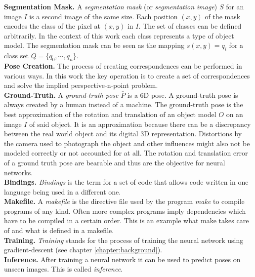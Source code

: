 \noindent\textbf{Segmentation Mask.} A \textit{segmentation mask} (or \textit{segmentation image}) $S$ for an image $I$ is a second image of the same size. Each position $(x, y)$ of the mask encodes the class of the pixel at $(x, y)$ in $I$. The set of classes can be defined arbitrarily. In the context of this work each class represents a type of object model. The segmentation mask can be seen as the mapping $s(x, y) = q_i$ for a class set $Q = \{q_0, \cdots, q_n\}$. \\

\noindent\textbf{Pose Creation.} The process of creating correspondences can be performed in various ways. In this work the key operation is to create a set of correspondences and solve the implied perspective-n-point problem. \\

\noindent\textbf{Ground-Truth.} A \textit{ground-truth pose} $\bar{P}$ is a 6D pose. A ground-truth pose is always created by a human instead of a machine. The ground-truth pose is the best approximation of the rotation and translation of an object model $O$ on an image $I$ of said object. It is an approximation because there can be a discrepancy between the real world object and its digital 3D representation. Distortions by the camera used to photograph the object and other influences might also not be modeled correctly or not accounted for at all. The rotation and translation error of a ground truth pose are bearable and thus are the objective for neural networks. \\

\noindent\textbf{Bindings.} \textit{Bindings} is the term for a set of code that allows code written in one language being used in a different one. \\

\noindent\textbf{Makefile.} A \textit{makefile} is the directive file used by the program \textit{make} to compile programs of any kind. Often more complex programs imply dependencies which have to be compiled in a certain order. This is an example what make takes care of and what is defined in a makefile. \\

\noindent\textbf{Training.} \textit{Training} stands for the process of training the neural network using gradient-descent (see chapter \ref{chapter:background}). \\

\noindent\textbf{Inference.} After training a neural network it can be used to predict poses on unseen images. This is called \textit{inference}.

